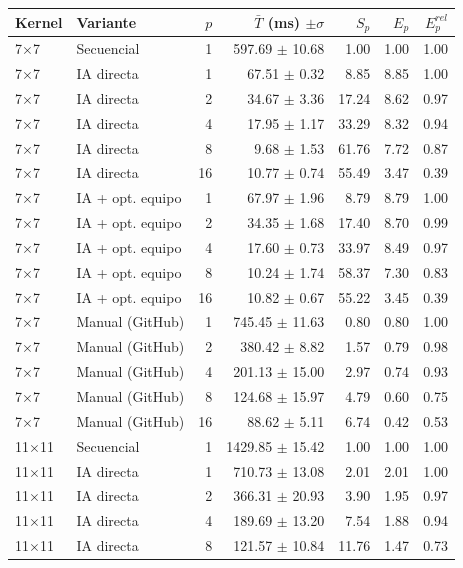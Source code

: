 \begin{tabular}{llrrrrr}
\toprule
Kernel & Variante & $p$ & $\bar{T}$ (ms) $\pm\sigma$ & $S_p$ & $E_p$ & $E^{rel}_p$ \\
\midrule
7$\times$7 & Secuencial & 1 & 597.69 $\pm$ 10.68 & 1.00 & 1.00 & 1.00 \\
7$\times$7 & IA directa & 1 & 67.51 $\pm$ 0.32 & 8.85 & 8.85 & 1.00 \\
7$\times$7 & IA directa & 2 & 34.67 $\pm$ 3.36 & 17.24 & 8.62 & 0.97 \\
7$\times$7 & IA directa & 4 & 17.95 $\pm$ 1.17 & 33.29 & 8.32 & 0.94 \\
7$\times$7 & IA directa & 8 & 9.68 $\pm$ 1.53 & 61.76 & 7.72 & 0.87 \\
7$\times$7 & IA directa & 16 & 10.77 $\pm$ 0.74 & 55.49 & 3.47 & 0.39 \\
7$\times$7 & IA + opt. equipo & 1 & 67.97 $\pm$ 1.96 & 8.79 & 8.79 & 1.00 \\
7$\times$7 & IA + opt. equipo & 2 & 34.35 $\pm$ 1.68 & 17.40 & 8.70 & 0.99 \\
7$\times$7 & IA + opt. equipo & 4 & 17.60 $\pm$ 0.73 & 33.97 & 8.49 & 0.97 \\
7$\times$7 & IA + opt. equipo & 8 & 10.24 $\pm$ 1.74 & 58.37 & 7.30 & 0.83 \\
7$\times$7 & IA + opt. equipo & 16 & 10.82 $\pm$ 0.67 & 55.22 & 3.45 & 0.39 \\
7$\times$7 & Manual (GitHub) & 1 & 745.45 $\pm$ 11.63 & 0.80 & 0.80 & 1.00 \\
7$\times$7 & Manual (GitHub) & 2 & 380.42 $\pm$ 8.82 & 1.57 & 0.79 & 0.98 \\
7$\times$7 & Manual (GitHub) & 4 & 201.13 $\pm$ 15.00 & 2.97 & 0.74 & 0.93 \\
7$\times$7 & Manual (GitHub) & 8 & 124.68 $\pm$ 15.97 & 4.79 & 0.60 & 0.75 \\
7$\times$7 & Manual (GitHub) & 16 & 88.62 $\pm$ 5.11 & 6.74 & 0.42 & 0.53 \\
\midrule
11$\times$11 & Secuencial & 1 & 1429.85 $\pm$ 15.42 & 1.00 & 1.00 & 1.00 \\
11$\times$11 & IA directa & 1 & 710.73 $\pm$ 13.08 & 2.01 & 2.01 & 1.00 \\
11$\times$11 & IA directa & 2 & 366.31 $\pm$ 20.93 & 3.90 & 1.95 & 0.97 \\
11$\times$11 & IA directa & 4 & 189.69 $\pm$ 13.20 & 7.54 & 1.88 & 0.94 \\
11$\times$11 & IA directa & 8 & 121.57 $\pm$ 10.84 & 11.76 & 1.47 & 0.73 \\

\end{tabular}
